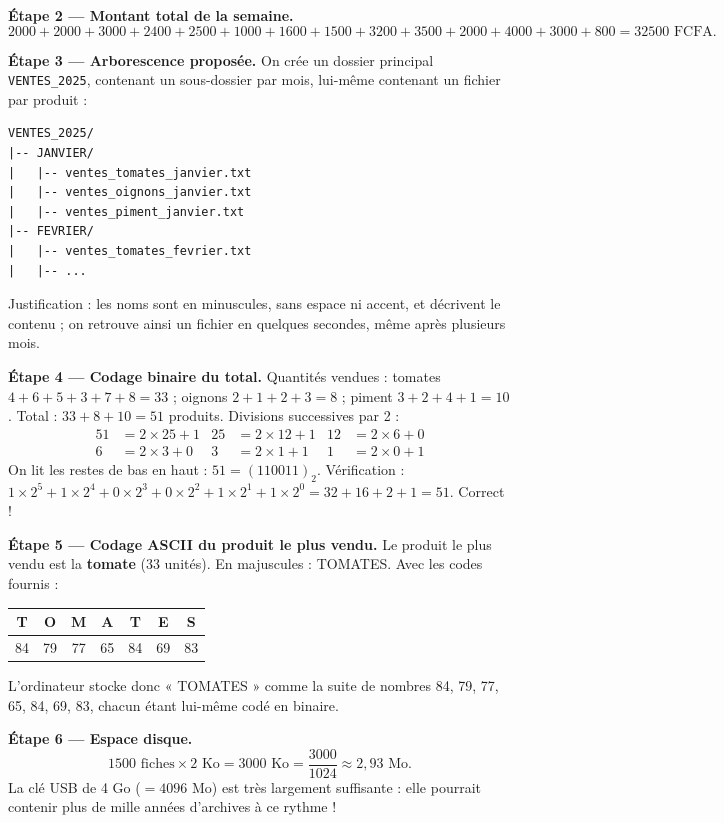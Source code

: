 \documentclass[11pt]{article}
\begin{document}
\begin{exoresolu}
\textbf{Étape 2 — Montant total de la semaine.}
\[ \num{2000}+\num{2000}+\num{3000}+\num{2400}+\num{2500}+\num{1000}+\num{1600}+\num{1500}+\num{3200}+\num{3500}+\num{2000}+\num{4000}+\num{3000}+800 = \num{32500} \text{ FCFA.} \]

\textbf{Étape 3 — Arborescence proposée.} On crée un dossier principal \texttt{VENTES\_2025}, contenant un sous-dossier par mois, lui-même contenant un fichier par produit :

\begin{lstlisting}
VENTES_2025/
|-- JANVIER/
|   |-- ventes_tomates_janvier.txt
|   |-- ventes_oignons_janvier.txt
|   |-- ventes_piment_janvier.txt
|-- FEVRIER/
|   |-- ventes_tomates_fevrier.txt
|   |-- ...
\end{lstlisting}

Justification : les noms sont en minuscules, sans espace ni accent, et décrivent le contenu ; on retrouve ainsi un fichier en quelques secondes, même après plusieurs mois.

\textbf{Étape 4 — Codage binaire du total.} Quantités vendues : tomates $4+6+5+3+7+8 = 33$ ; oignons $2+1+2+3 = 8$ ; piment $3+2+4+1 = 10$. Total : $33+8+10 = 51$ produits. Divisions successives par 2 :
\begin{align*}
51 &= 2 \times 25 + 1 & 25 &= 2 \times 12 + 1 & 12 &= 2 \times 6 + 0 \\
6 &= 2 \times 3 + 0 & 3 &= 2 \times 1 + 1 & 1 &= 2 \times 0 + 1
\end{align*}
On lit les restes de bas en haut : $51 = (110011)_2$. Vérification : $1\times 2^5 + 1\times 2^4 + 0\times 2^3 + 0\times 2^2 + 1\times 2^1 + 1\times 2^0 = 32+16+2+1 = 51$. Correct !

\textbf{Étape 5 — Codage ASCII du produit le plus vendu.} Le produit le plus vendu est la \textbf{tomate} (33 unités). En majuscules : TOMATES. Avec les codes fournis :
\begin{center}
\begin{tabular}{|c|c|c|c|c|c|c|}
\hline
\rowcolor{popblueL} T & O & M & A & T & E & S \\
\hline
84 & 79 & 77 & 65 & 84 & 69 & 83 \\
\hline
\end{tabular}
\end{center}
L'ordinateur stocke donc « TOMATES » comme la suite de nombres 84, 79, 77, 65, 84, 69, 83, chacun étant lui-même codé en binaire.

\textbf{Étape 6 — Espace disque.}
\[ \num{1500} \text{ fiches} \times 2 \text{ Ko} = \num{3000} \text{ Ko} = \frac{\num{3000}}{\num{1024}} \approx 2,93 \text{ Mo.} \]
La clé USB de 4 Go ($= \num{4096}$ Mo) est très largement suffisante : elle pourrait contenir plus de mille années d'archives à ce rythme !


\end{exoresolu}
\end{document}
